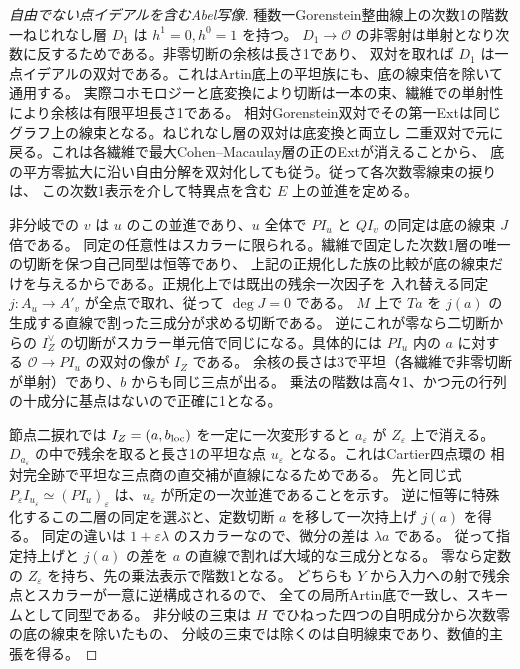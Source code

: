 \begin{proof}[自由でない点イデアルを含むAbel写像]
種数一Gorenstein整曲線上の次数1の階数一ねじれなし層 $D_1$ は $h^1=0,h^0=1$ を持つ。
$D_1\to\mathcal O$ の非零射は単射となり次数に反するためである。非零切断の余核は長さ1であり、
双対を取れば $D_1$ は一点イデアルの双対である。これはArtin底上の平坦族にも、底の線束倍を除いて通用する。
実際コホモロジーと底変換により切断は一本の束、繊維での単射性により余核は有限平坦長さ1である。
相対Gorenstein双対でその第一Extは同じグラフ上の線束となる。ねじれなし層の双対は底変換と両立し
二重双対で元に戻る。これは各繊維で最大Cohen--Macaulay層の正のExtが消えることから、
底の平方零拡大に沿い自由分解を双対化しても従う。従って各次数零線束の捩りは、
この次数1表示を介して特異点を含む $E$ 上の並進を定める。

非分岐での $v$ は $u$ のこの並進であり、$u$ 全体で $PI_u$ と $QI_v$ の同定は底の線束 $J$ 倍である。
同定の任意性はスカラーに限られる。繊維で固定した次数1層の唯一の切断を保つ自己同型は恒等であり、
上記の正規化した族の比較が底の線束だけを与えるからである。正規化上では既出の残余一次因子を
入れ替える同定 $j:A_u\to A'_v$ が全点で取れ、従って $\deg J=0$ である。
$M$ 上で $Ta$ を $j(a)$ の生成する直線で割った三成分が求める切断である。
逆にこれが零なら二切断からの $I_Z^\vee$ の切断がスカラー単元倍で同じになる。具体的には
$PI_u$ 内の $a$ に対する $\mathcal O\to PI_u$ の双対の像が $I_Z$ である。
余核の長さは3で平坦（各繊維で非零切断が単射）であり、$b$ からも同じ三点が出る。
乗法の階数は高々1、かつ元の行列の十成分に基点はないので正確に1となる。

節点二捩れでは $I_Z=(a,b_{\rm loc})$ を一定に一次変形すると $a_\varepsilon$ が $Z_\varepsilon$ 上で消える。
$D_{a_\varepsilon}$ の中で残余を取ると長さ1の平坦な点 $u_\varepsilon$ となる。これはCartier四点環の
相対完全跡で平坦な三点商の直交補が直線になるためである。
先と同じ式 $P_\varepsilon I_{u_\varepsilon}\simeq (P I_u)_\varepsilon$ は、$u_\varepsilon$ が所定の一次並進であることを示す。
逆に恒等に特殊化するこの二層の同定を選ぶと、定数切断 $a$ を移して一次持上げ $j(a)$ を得る。
同定の違いは $1+\varepsilon\lambda$ のスカラーなので、微分の差は $\lambda a$ である。
従って指定持上げと $j(a)$ の差を $a$ の直線で割れば大域的な三成分となる。
零なら定数の $Z_\varepsilon$ を持ち、先の乗法表示で階数1となる。
どちらも $Y$ から入力への射で残余点とスカラーが一意に逆構成されるので、
全ての局所Artin底で一致し、スキームとして同型である。
非分岐の三束は $H$ でひねった四つの自明成分から次数零の底の線束を除いたもの、
分岐の三束では除くのは自明線束であり、数値的主張を得る。
\end{proof}

